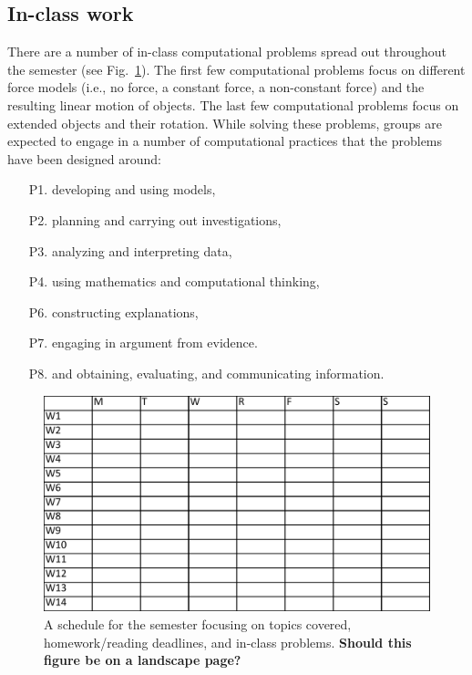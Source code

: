 \documentclass{msuphddissertation}
\begin{document}
\begin{doublespace}
\section{In-class work}

There are a number of in-class computational problems spread out throughout the semester (see Fig.~\ref{CH3:Schedule}).  The first few computational problems focus on different force models (i.e., no force, a constant force, a non-constant force) and the resulting linear motion of objects.  The last few computational problems focus on extended objects and their rotation.  While solving these problems, groups are expected to engage in a number of computational practices that the problems have been designed around: \begin{enumerate}
\item[P1.] developing and using models,
\item[P2.] planning and carrying out investigations,
\item[P3.] analyzing and interpreting data,
\item[P4.] using mathematics and computational thinking,
\item[P6.] constructing explanations,
\item[P7.] engaging in argument from evidence.
\item[P8.] and obtaining, evaluating, and communicating information.
\end{enumerate}

\begin{figure}[ht]\centering
\includegraphics[scale=0.60]{images/CH3Schedule.pdf}
\caption{A schedule for the semester focusing on topics covered, homework/reading deadlines, and in-class problems.  \textbf{Should this figure be on a landscape page?}}\label{CH3:Schedule}
\end{figure}


\end{doublespace}
\end{document}
